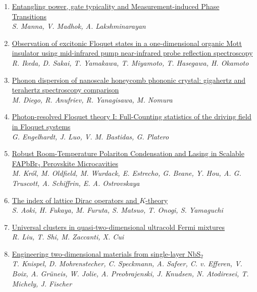 \documentclass{article}
\begin{document}
\begin{enumerate}
\item\href{http://arxiv.org/abs/2407.17776v1}{\textsf{Entangling power, gate typicality and Measurement-induced Phase
  Transitions}}\\
{\small\color{blue}\textsl{S. Manna, V. Madhok, A. Lakshminarayan}}
\item\href{http://arxiv.org/abs/2407.17759v1}{\textsf{Observation of excitonic Floquet states in a one-dimensional organic
  Mott insulator using mid-infrared pump near-infrared probe reflection
  spectroscopy}}\\
{\small\color{blue}\textsl{R. Ikeda, D. Sakai, T. Yamakawa, T. Miyamoto, T. Hasegawa, H. Okamoto}}
\item\href{http://arxiv.org/abs/2407.17746v1}{\textsf{Phonon dispersion of nanoscale honeycomb phononic crystal: gigahertz and
  terahertz spectroscopy comparison}}\\
{\small\color{blue}\textsl{M. Diego, R. Anufriev, R. Yanagisawa, M. Nomura}}
\item\href{http://arxiv.org/abs/2407.17732v1}{\textsf{Photon-resolved Floquet theory I: Full-Counting statistics of the
  driving field in Floquet systems}}\\
{\small\color{blue}\textsl{G. Engelhardt, J. Luo, V. M. Bastidas, G. Platero}}
\item\href{http://arxiv.org/abs/2407.17713v1}{\textsf{Robust Room-Temperature Polariton Condensation and Lasing in Scalable
  FAPbBr$_3$ Perovskite Microcavities}}\\
{\small\color{blue}\textsl{M. Król, M. Oldfield, M. Wurdack, E. Estrecho, G. Beane, Y. Hou, A. G. Truscott, A. Schiffrin, E. A. Ostrovskaya}}
\item\href{http://arxiv.org/abs/2407.17708v1}{\textsf{The index of lattice Dirac operators and $K$-theory}}\\
{\small\color{blue}\textsl{S. Aoki, H. Fukaya, M. Furuta, S. Matsuo, T. Onogi, S. Yamaguchi}}
\item\href{http://arxiv.org/abs/2407.17702v1}{\textsf{Universal clusters in quasi-two-dimensional ultracold Fermi mixtures}}\\
{\small\color{blue}\textsl{R. Liu, T. Shi, M. Zaccanti, X. Cui}}
\item\href{http://arxiv.org/abs/2407.17655v1}{\textsf{Engineering two-dimensional materials from single-layer NbS$_2$}}\\
{\small\color{blue}\textsl{T. Knispel, D. Mohrenstecher, C. Speckmann, A. Safeer, C. v. Efferen, V. Boix, A. Grüneis, W. Jolie, A. Preobrajenski, J. Knudsen, N. Atodiresei, T. Michely, J. Fischer}}

\end{enumerate}
\end{document}
